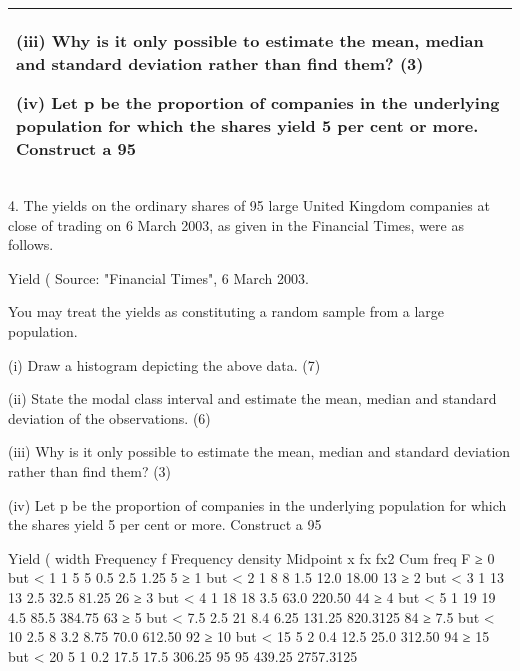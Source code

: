 \documentclass[a4paper,12pt]{article}
\begin{document}
\begin{table}[ht!]
 
\centering
 
\begin{tabular}{|p{15cm}|}
 
\hline  

(iii) Why is it only possible to estimate the mean, median and standard deviation rather than find them? (3) 
 
(iv) Let p be the proportion of companies in the underlying population for which the shares yield 5 per cent or more.  Construct a 95%
 
\\ \hline
  
\end{tabular}

\end{table} 
\begin{framed} 
 
4. The yields on the ordinary shares of 95 large United Kingdom companies at close of trading on 6 March 2003, as given in the Financial Times, were as follows. 
 
Yield (%
           Source:  "Financial Times", 6 March 2003. 
 
You may treat the yields as constituting a random sample from a large population. 
 
(i) Draw a histogram depicting the above data. 
(7) 
 
(ii) State the modal class interval and estimate the mean, median and standard deviation of the observations. (6) 
 
(iii) Why is it only possible to estimate the mean, median and standard deviation rather than find them? (3) 
 
(iv) Let p be the proportion of companies in the underlying population for which the shares yield 5 per cent or more.  Construct a 95%
 

\end{framed}


\newpage
\begin{framed}
Yield (%
width
Frequency f Frequency
density
Midpoint x fx fx2 Cum freq
F
≥ 0 but < 1 1 5 5 0.5 2.5 1.25 5
≥ 1 but < 2 1 8 8 1.5 12.0 18.00 13
≥ 2 but < 3 1 13 13 2.5 32.5 81.25 26
≥ 3 but < 4 1 18 18 3.5 63.0 220.50 44
≥ 4 but < 5 1 19 19 4.5 85.5 384.75 63
≥ 5 but < 7.5 2.5 21 8.4 6.25 131.25 820.3125 84
≥ 7.5 but < 10 2.5 8 3.2 8.75 70.0 612.50 92
≥ 10 but < 15 5 2 0.4 12.5 25.0 312.50 94
≥ 15 but < 20 5 1 0.2 17.5 17.5 306.25 95
95 439.25 2757.3125
\end{framed}
\end{document}
